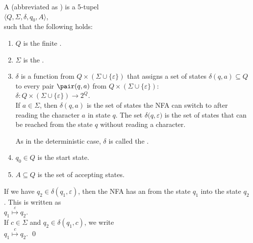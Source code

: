 \begin{Definition}[NFA]
A  
(abbreviated as ) 
is a  5-tupel  
\\[0.2cm]
\hspace*{1.3cm}
$\langle Q, \Sigma, \delta, q_0, A\rangle$,
\\[0.2cm]
such that the following holds:
\begin{enumerate}
\item $Q$ is the finite .
\item $\Sigma$ is the .
\item $\delta$ is a function from $Q \times (\Sigma \cup \{ \varepsilon \})$ that assigns a set of states
      $\delta(q, a) \subseteq Q$ to every pair $\pair(q, a)$ from $Q \times (\Sigma \cup \{ \varepsilon \})$:
      \\[0.2cm]
      \hspace*{1.3cm}
      $\delta: Q \times (\Sigma \cup \{\varepsilon\}) \rightarrow 2^Q$.
      \\[0.2cm]
      If $a \in \Sigma$, then $\delta(q, a)$ is the set of states the \textsc{NFA} can switch to
      after reading the character $a$ in state $q$.  The set $\delta\bigl(q, \varepsilon)$ is the
      set of states that can be reached from the state $q$ without reading a character.
      
      As in the deterministic case, $\delta$ is called the .
\item $q_0 \in Q$ is the start state.
\item $A \subseteq Q$ is the set of accepting states. 
\end{enumerate}
If we have $q_2 \in \delta(q_1, \varepsilon)$, then the \textsc{NFA} has an
 from the state $q_1$ into the state $q_2$.  This is written as
\\[0.2cm]
\hspace*{1.3cm}
$q_1 \stackrel{\varepsilon}{\mapsto} q_2$.
\\[0.2cm]
If  $c \in \Sigma$ and  $q_2 \in \delta(q_1, c)$, we write
\\[0.2cm]
\hspace*{1.3cm}
$q_1 \stackrel{c}{\mapsto} q_2$. \qed
\end{Definition}

